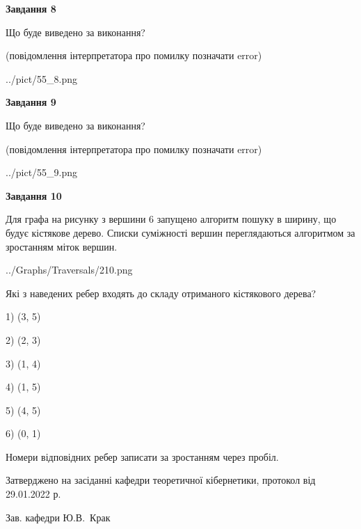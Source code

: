 \documentclass[12pt, ukrainian]{article}
\begin{document}
{\begin {large}
{\begin {center}\textbf{Завдання 8}\end {center}}\par
Що буде виведено за виконання?\par
 (повідомлення інтерпретатора про помилку позначати error)\par
\begin{center}
	{../pict/55_8.png}
\end{center}
\newpage

{\begin {center}\textbf{Завдання 9}\end {center}}\par
Що буде виведено за виконання?\par
 (повідомлення інтерпретатора про помилку позначати error)\par
\begin{center}
	{../pict/55_9.png}
\end{center}
\newpage

{\begin {center}\textbf{Завдання 10}\end {center}}\par
Для графа на рисунку з вершини 6 запущено алгоритм пошуку в ширину, що будує кістякове дерево. Списки суміжності вершин переглядаються алгоритмом за зростанням міток вершин.\par
\begin{center}
	{../Graphs/Traversals/210.png}
\end{center}
\par Які з наведених ребер входять до складу отриманого кістякового дерева?\par
1) (3, 5)\par
2) (2, 3)\par
3) (1, 4)\par
4) (1, 5)\par
5) (4, 5)\par
6) (0, 1)\par
{\vskip 15pt} Номери відповідних ребер записати за зростанням через пробіл.\par
\newpage


\end {large}
}
{\smallskip \begin {small} Затверджено на засіданні кафедри теоретичної кібернетики, протокол  від   29.01.2022 р.\par\smallskip\smallskip
{\parbox {6.5 cm}{Зав. кафедри \dotfill Ю.В.~Крак}} \end{small}}
\end{document}
